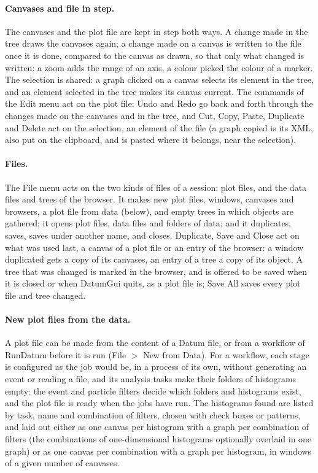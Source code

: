 \paragraph{Canvases and file in step.}
The canvases and the plot file are kept in step both ways. A change made in the tree draws the canvases again; a
change made on a canvas is written to the file once it is done, compared to the canvas as drawn, so that only what
changed is written: a zoom adds the range of an axis, a colour picked the colour of a marker. The selection is shared:
a graph clicked on a canvas selects its element in the tree, and an element selected in the tree makes its canvas
current. The commands of the Edit menu act on the plot file: Undo and Redo go back and forth through the changes made
on the canvases and in the tree, and Cut, Copy, Paste, Duplicate and Delete act on the selection, an element of the
file (a graph copied is its XML, also put on the clipboard, and is pasted where it belongs, near the selection).

\paragraph{Files.}
The File menu acts on the two kinds of files of a session: plot files, and the data files and trees of the browser.
It makes new plot files, windows, canvases and browsers, a plot file from data (below), and empty trees in which
objects are gathered; it opens plot files, data files and folders of data; and it duplicates, saves, saves under
another name, and closes. Duplicate, Save and Close act on what was used last, a canvas of a plot file or an entry
of the browser: a window duplicated gets a copy of its canvases, an entry of a tree a copy of its object. A tree
that was changed is marked in the browser, and is offered to be saved when it is closed or when DatumGui quits, as a
plot file is; Save All saves every plot file and tree changed.

\paragraph{New plot files from the data.}
A plot file can be made from the content of a Datum file, or from a workflow of RunDatum before it is run (File $>$ New
from Data). For a workflow, each stage is configured as the job would be, in a process of its own, without generating
an event or reading a file, and its analysis tasks make their folders of histograms empty: the event and particle
filters decide which folders and histograms exist, and the plot file is ready when the jobs have run. The histograms
found are listed by task, name and combination of filters, chosen with check boxes or patterns, and laid out either as
one canvas per histogram with a graph per combination of filters (the combinations of one-dimensional histograms
optionally overlaid in one graph) or as one canvas per combination with a graph per histogram, in windows of a given
number of canvases.

